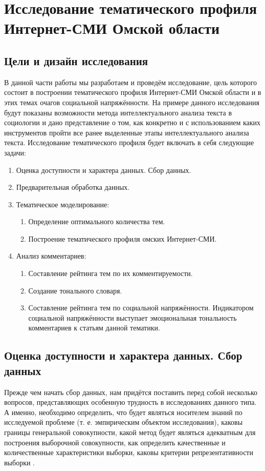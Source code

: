 \chapter{Исследование тематического профиля Интернет-СМИ Омской области} \label{chapt2}
\section{Цели и дизайн исследования}
В данной части работы мы разработаем и проведём исследование, цель которого состоит в построении тематического профиля Интернет-СМИ Омской области и в этих темах очагов социальной напряжённости. На примере данного исследования будут показаны возможности метода интеллектуального анализа текста в социологии и дано представление о том, как конкретно и с использованием каких инструментов пройти все ранее выделенные этапы интеллектуального анализа текста. Исследование тематического профиля будет включать в себя следующие задачи:

\begin{enumerate}
\item Оценка доступности и характера данных. Сбор данных.
\item Предварительная обработка данных.
\item Тематическое моделирование:
	\begin{enumerate}
	\item Определение оптимального количества тем.
	\item Построение тематического профиля омских Интернет-СМИ.
	\end{enumerate}
\item Анализ комментариев:
	\begin{enumerate}
	\item Составление рейтинга тем по их комментируемости.
	\item Создание тонального словаря.
	\item Составление рейтинга тем по социальной напряжённости. Индикатором социальной напряжённости выступает эмоциональная тональность комментариев к статьям данной тематики.
	\end{enumerate}

\end{enumerate}

\section{Оценка доступности и характера данных. Сбор данных}
Прежде чем начать сбор данных, нам придётся поставить перед собой несколько вопросов, представляющих особенную трудность в исследованиях данного типа. А именно, необходимо определить, что будет являться носителем знаний по исследуемой проблеме (т. е. эмпирическим объектом исследования), каковы границы генеральной совокупности, какой метод будет являться адекватным для построения выборочной совокупности, как определить качественные и количественные характеристики выборки, каковы критерии репрезентативности выборки \cite{methodlogy_internet}.

